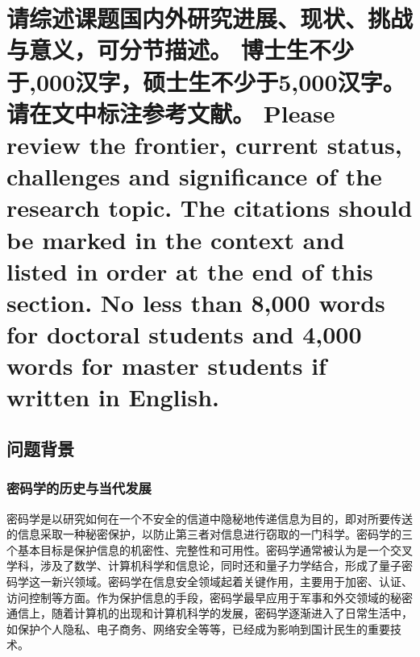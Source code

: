 \documentclass[a4paper,zihao=-4,AutoFakeBold]{ctexart}
\begin{document}
\vspace{-2\baselineskip}

\kaishu\setlength{\parskip}{0.5\baselineskip}\linespread{1.75}\selectfont

\makeatletter
{}
\makeatother




\section{请综述课题国内外研究进展、现状、挑战与意义，可分节描述。
  博士生不少于,000汉字，硕士生不少于5,000汉字。请在文中标注参考文献。
  Please review the frontier, current status,
  challenges and significance of the research topic.
  The citations should be marked in the context
  and listed in order at the end of this section.
  No less than 8,000 words for doctoral students
  and 4,000 words for master students if written in English.}

\subsection{问题背景}
\subsubsection{密码学的历史与当代发展}
密码学是以研究如何在一个不安全的信道中隐秘地传递信息为目的，即对所要传送的信息采取一种秘密保护，以防止第三者对信息进行窃取的一门科学。密码学的三个基本目标是保护信息的机密性、完整性和可用性。密码学通常被认为是一个交叉学科，涉及了数学、计算机科学和信息论，同时还和量子力学结合，形成了量子密码学这一新兴领域。密码学在信息安全领域起着关键作用，主要用于加密、认证、访问控制等方面。作为保护信息的手段，密码学最早应用于军事和外交领域的秘密通信上，随着计算机的出现和计算机科学的发展，密码学逐渐进入了日常生活中，如保护个人隐私、电子商务、网络安全等等，已经成为影响到国计民生的重要技术。
\end{document}
